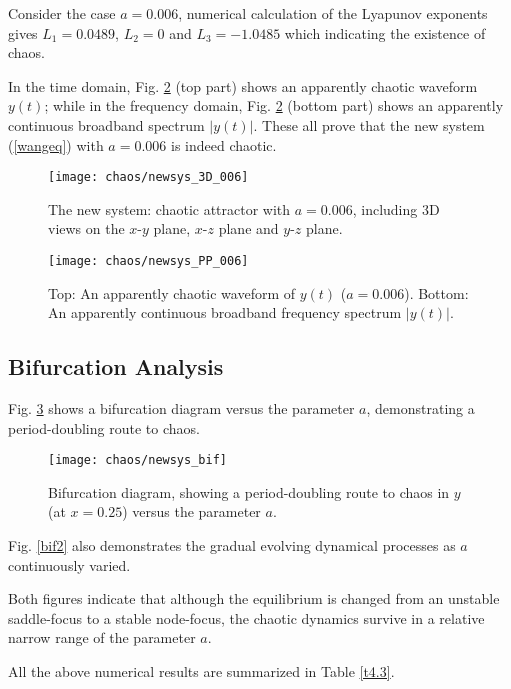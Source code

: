 Consider the case $a=0.006$, numerical calculation of the 
Lyapunov exponents gives $L_1 = 0.0489$, $L_2 =0$ and $L_3
=-1.0485$ which indicating the existence of chaos.

In the time domain, Fig. \ref{006} (top part) shows an apparently
chaotic waveform $y(t)$; while in the frequency domain,
Fig. \ref{006} (bottom part) shows an apparently continuous
broadband spectrum $|y(t)|$. These all prove that the new system
(\ref{wangeq}) with $a=0.006$ is indeed chaotic.

\begin{figure}[h]
\centering
\texttt{[image: chaos/newsys\_3D\_006]}
 \caption{\label{0063D}The new system: chaotic attractor with
$a=0.006$, including 3D views on the $x$-$y$ plane, $x$-$z$ plane
and $y$-$z$ plane.} 
\end{figure}

\bigbreak

\begin{figure}[h]
\centering
\texttt{[image: chaos/newsys\_PP\_006]}
 \caption{\label{006}Top: An apparently chaotic waveform of
$y(t)$ ($a=0.006$). Bottom: An apparently continuous broadband
frequency spectrum $|y(t)|$.}
\end{figure}

\subsection{Bifurcation Analysis}

Fig. \ref{bif} shows a bifurcation diagram versus the parameter
$a$, demonstrating a period-doubling route to chaos.

\begin{figure}[h]
\centering
\texttt{[image: chaos/newsys\_bif]}
\caption{\label{bif}Bifurcation diagram, showing a
period-doubling route to chaos in $y$ (at $x=0.25$) versus the
parameter $a$.} 
\end{figure}

Fig. \ref{bif2} also demonstrates the gradual evolving dynamical
processes as $a$ continuously varied.

Both figures indicate that although the equilibrium is changed
from an unstable saddle-focus to a stable node-focus, the chaotic
dynamics survive in a relative narrow range of the parameter $a$.

All the above numerical results are summarized in Table \ref{t4.3}.

